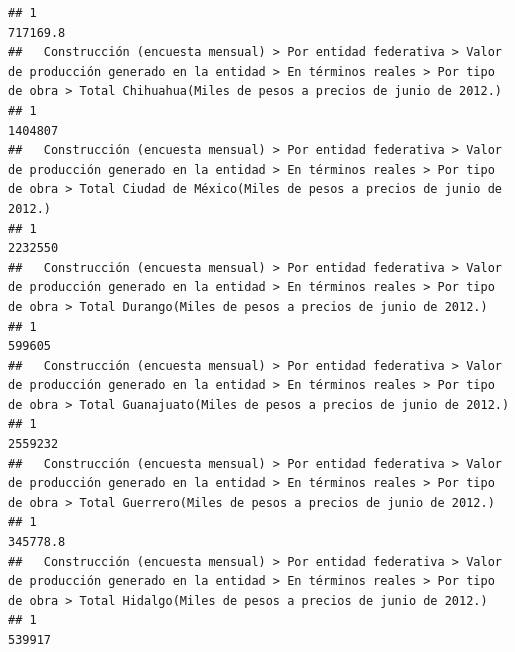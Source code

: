 \documentclass[
]{article}
\begin{document}
\begin{verbatim}
## 1                                                                                                                                                                                                   717169.8
##   Construcción (encuesta mensual) > Por entidad federativa > Valor de producción generado en la entidad > En términos reales > Por tipo de obra > Total Chihuahua(Miles de pesos a precios de junio de 2012.) 
## 1                                                                                                                                                                                                      1404807
##   Construcción (encuesta mensual) > Por entidad federativa > Valor de producción generado en la entidad > En términos reales > Por tipo de obra > Total Ciudad de México(Miles de pesos a precios de junio de 2012.) 
## 1                                                                                                                                                                                                             2232550
##   Construcción (encuesta mensual) > Por entidad federativa > Valor de producción generado en la entidad > En términos reales > Por tipo de obra > Total Durango(Miles de pesos a precios de junio de 2012.) 
## 1                                                                                                                                                                                                     599605
##   Construcción (encuesta mensual) > Por entidad federativa > Valor de producción generado en la entidad > En términos reales > Por tipo de obra > Total Guanajuato(Miles de pesos a precios de junio de 2012.) 
## 1                                                                                                                                                                                                       2559232
##   Construcción (encuesta mensual) > Por entidad federativa > Valor de producción generado en la entidad > En términos reales > Por tipo de obra > Total Guerrero(Miles de pesos a precios de junio de 2012.) 
## 1                                                                                                                                                                                                    345778.8
##   Construcción (encuesta mensual) > Por entidad federativa > Valor de producción generado en la entidad > En términos reales > Por tipo de obra > Total Hidalgo(Miles de pesos a precios de junio de 2012.) 
## 1                                                                                                                                                                                                     539917

\end{verbatim}
\end{document}
